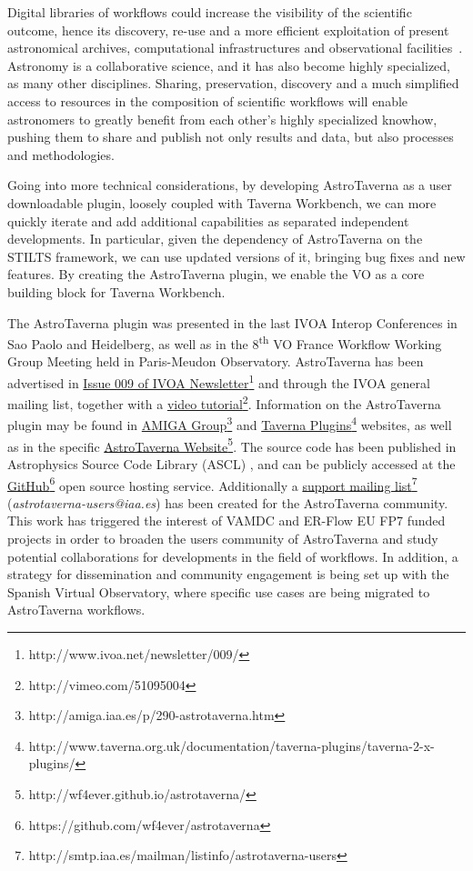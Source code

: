 \documentclass{aa}
\begin{document}
Digital libraries of workflows could increase the visibility of the scientific outcome, hence its discovery, re-use and a more efficient exploitation of present astronomical archives, computational infrastructures and observational facilities~\citep{Ruiz2012}. Astronomy is a collaborative science, and it has also become highly specialized, as many other disciplines. Sharing, preservation, discovery and a much simplified access to resources in the composition of scientific workflows will enable astronomers to greatly benefit from each other’s highly specialized knowhow, pushing them to share and publish not only results and data, but also processes and methodologies.

Going into more technical considerations, by developing AstroTaverna as a user downloadable plugin, loosely coupled with Taverna Workbench, we can more quickly iterate and add additional capabilities as separated independent developments. In particular, given the dependency of AstroTaverna on the STILTS framework, we can use updated versions of it, bringing bug fixes and new features. By creating the AstroTaverna plugin, we enable the VO as a core building block for Taverna Workbench.

The AstroTaverna plugin was presented in the last IVOA Interop Conferences in Sao Paolo and Heidelberg, as well as in the 8\textsuperscript{th} VO France Workflow Working Group Meeting held in Paris-Meudon Observatory. AstroTaverna has been advertised in \href{http://www.ivoa.net/newsletter/009/}{Issue 009 of IVOA Newsletter}\footnote{http://www.ivoa.net/newsletter/009/} and through the IVOA general mailing list, together with a \href{http://vimeo.com/51095004}{video tutorial}\footnote{http://vimeo.com/51095004}. Information on the AstroTaverna plugin may be found in \href{http://amiga.iaa.es/p/290-astrotaverna.htm}{AMIGA Group}\footnote{http://amiga.iaa.es/p/290-astrotaverna.htm} and \href{http://www.taverna.org.uk/documentation/taverna-plugins/taverna-2-x-plugins/}{Taverna Plugins}\footnote{http://www.taverna.org.uk/documentation/taverna-plugins/taverna-2-x-plugins/} websites, as well as in the specific \href{http://wf4ever.github.io/astrotaverna/}{AstroTaverna Website}\footnote{\label{website}http://wf4ever.github.io/astrotaverna/}. The source code has been published in Astrophysics Source Code Library (ASCL) \citealt{Garrido2013}, and can be publicly accessed at the \href{https://github.com/wf4ever/astrotaverna}{GitHub}\footnote{https://github.com/wf4ever/astrotaverna} open source hosting service. Additionally a \href{http://smtp.iaa.es/mailman/listinfo/astrotaverna-users}{support mailing list}\footnote{http://smtp.iaa.es/mailman/listinfo/astrotaverna-users}  (\textit{astrotaverna-users@iaa.es}) has been created for the AstroTaverna community.  This work has triggered the interest of VAMDC and ER-Flow EU FP7 funded projects in order to broaden the users community of AstroTaverna and study potential collaborations for developments in the field of workflows. In addition, a strategy for dissemination and community engagement is being set up with the Spanish Virtual Observatory, where specific use cases are being migrated to AstroTaverna workflows.  
\end{document}
